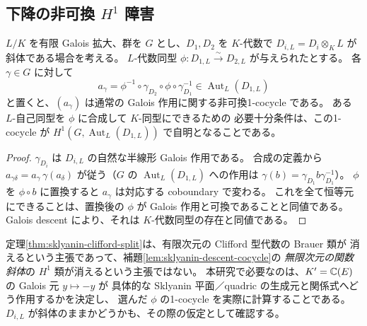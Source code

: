 \subsection{下降の非可換 $H^1$ 障害}
\begin{lemma}[体拡大後の斜体同型の下降判定]\label{lem:sklyanin-descent-cocycle}
$L/K$ を有限 Galois 拡大、群を $G$ とし、$D_1,D_2$ を $K$-代数で
$D_{i,L}=D_i\otimes_K L$ が斜体である場合を考える。
$L$-代数同型 $\phi:D_{1,L}\xrightarrow{\sim}D_{2,L}$ が与えられたとする。
各 $\gamma\in G$ に対して
\[
 a_\gamma=\phi^{-1}\circ\gamma_{D_2}\circ\phi
 \circ\gamma_{D_1}^{-1}\in\operatorname{Aut}_L(D_{1,L})
\]
と置くと、$(a_\gamma)$ は通常の Galois 作用に関する非可換1-cocycle である。
ある $L$-自己同型を $\phi$ に合成して $K$-同型にできるための
必要十分条件は、この1-cocycle が
$H^1(G,\operatorname{Aut}_L(D_{1,L}))$ で自明となることである。
\end{lemma}
\begin{proof}
$\gamma_{D_i}$ は $D_{i,L}$ の自然な半線形 Galois 作用である。
合成の定義から
$a_{\gamma\delta}=a_\gamma\,\gamma(a_\delta)$
が従う（$G$ の $\operatorname{Aut}_L(D_{1,L})$ への作用は
$\gamma(b)=\gamma_{D_1}b\gamma_{D_1}^{-1}$）。
$\phi$ を $\phi\circ b$ に置換すると $a_\gamma$ は対応する coboundary で変わる。
これを全て恒等元にできることは、置換後の $\phi$ が Galois 作用と可換であることと同値である。
Galois descent により、それは $K$-代数同型の存在と同値である。
\end{proof}

\begin{remark}
定理\ref{thm:sklyanin-clifford-split}は、有限次元の Clifford 型代数の Brauer 類が
消えるという主張であって、補題\ref{lem:sklyanin-descent-cocycle}の
\emph{無限次元の関数斜体}の $H^1$ 類が消えるという主張ではない。
本研究で必要なのは、$K'=\mathbb C(E)$ の Galois 元 $y\mapsto-y$ が
具体的な Sklyanin 平面／quadric の生成元と関係式へどう作用するかを決定し、
選んだ $\phi$ の1-cocycle を実際に計算することである。
$D_{i,L}$ が斜体のままかどうかも、その際の仮定として確認する。
\end{remark}

